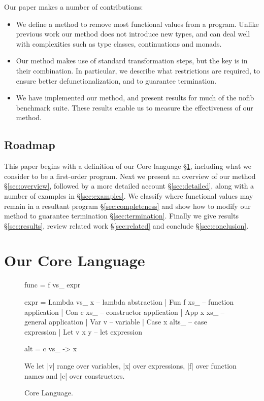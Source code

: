 \documentclass[preprint]{sigplanconf}
\begin{document}
Our paper makes a number of contributions:

\begin{itemize}
\item We define a method to remove most functional values from a program. Unlike previous work our method does not introduce new types, and can deal well with complexities such as type classes, continuations and monads.
\item Our method makes use of standard transformation steps, but the key is in their combination. In particular, we describe what restrictions are required, to ensure better defunctionalization, and to guarantee termination.
\item We have implemented our method, and present results for much of the nofib benchmark suite. These results enable us to measure the effectiveness of our method.
\end{itemize}

\subsection{Roadmap}

This paper begins with a definition of our Core language \S\ref{sec:core}, including what we consider to be a first-order program. Next we present an overview of our method \S\ref{sec:overview}, followed by a more detailed account \S\ref{sec:detailed}, along with a number of examples in \S\ref{sec:examples}. We classify where functional values may remain in a resultant program \S\ref{sec:completeness} and show how to modify our method to guarantee termination \S\ref{sec:termination}. Finally we give results \S\ref{sec:results}, review related work \S\ref{sec:related} and conclude \S\ref{sec:conclusion}.

\section{Our Core Language}
\label{sec:core}

\begin{figure}
\begin{code}
func = f vs_ expr

expr  =  Lambda vs_ x    -- lambda abstraction
      |  Fun f xs_       -- function application
      |  Con c xs_       -- constructor application
      |  App x xs_       -- general application
      |  Var v           -- variable
      |  Case x alts_    -- case expression
      |  Let v x y       -- let expression

alt = c vs_ -> x
\end{code}

We let |v| range over variables, |x| over expressions, |f| over function names and |c| over constructors.
\caption{Core Language.}
\label{fig:core}
\end{figure}
\end{document}
